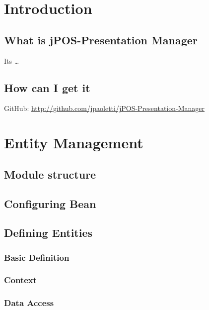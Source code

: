 





\pagestyle{plain}

\tableofcontents

\clearpage

\section{Introduction}

\subsection{What is jPOS-Presentation Manager}

Its \ldots

\subsection{How can I get it}

GitHub: \url{http://github.com/jpaoletti/jPOS-Presentation-Manager}

\section{Entity Management}

\subsection{Module structure}

\subsection{Configuring Bean}


\subsection{Defining Entities}

\subsubsection{Basic Definition}

\subsubsection{Context}

\subsubsection{Data Access}


